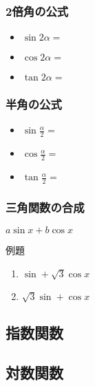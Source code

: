 \documentclass[10pt,dvipdfmx]{jsarticle}
\begin{document}
\begin{multicols}{2}


  \subsubsection*{2倍角の公式}
  \begin{large}
    \begin{itemize}
      \item $\sin2\alpha=$
      \item $\cos2\alpha=$
      \item $\tan2\alpha=$
    \end{itemize}
  \end{large}

  \subsubsection*{半角の公式}
  \begin{large}
    \begin{itemize}
      \item $\sin\frac{\alpha}{2}=$
      \item $\cos\frac{\alpha}{2}=$
      \item $\tan\frac{\alpha}{2}=$
    \end{itemize}
  \end{large}

\end{multicols}

\subsubsection*{三角関数の合成}
$a\sin x+b\cos x$\vspace{10mm}
\begin{itembox}[l]{例題}
  \begin{large}
    \begin{enumerate}
      \item $\sin +\sqrt{3}\cos x$
      \item $\sqrt{3}\sin +\cos x$
    \end{enumerate}
  \end{large}
\end{itembox}

\newpage
\subsection*{指数関数}
\subsection*{対数関数}
\end{document}

